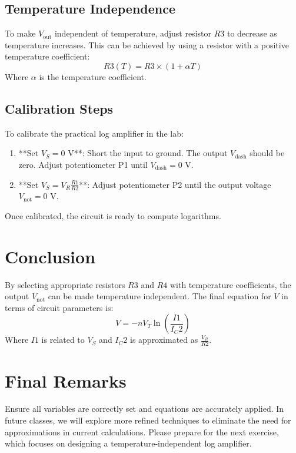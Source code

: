 \subsection{Temperature Independence}

To make \( V_{\text{out}} \) independent of temperature, adjust resistor \( R3 \) to decrease as temperature increases. This can be achieved by using a resistor with a positive temperature coefficient:
\[
R3(T) = R3 \times (1 + \alpha T)
\]
Where \( \alpha \) is the temperature coefficient.

\subsection{Calibration Steps}

To calibrate the practical log amplifier in the lab:
\begin{enumerate}
    \item **Set \( V_S = 0 \text{ V} \)**: Short the input to ground. The output \( V_{\text{dash}} \) should be zero. Adjust potentiometer P1 until \( V_{\text{dash}} = 0 \text{ V} \).
    \item **Set \( V_S = V_R \frac{R1}{R2} \)**: Adjust potentiometer P2 until the output voltage \( V_{\text{not}} = 0 \text{ V} \).
\end{enumerate}
Once calibrated, the circuit is ready to compute logarithms.

\section{Conclusion}

By selecting appropriate resistors \( R3 \) and \( R4 \) with temperature coefficients, the output \( V_{\text{not}} \) can be made temperature independent. The final equation for \( V \) in terms of circuit parameters is:
\[
V = -n V_T \ln\left(\frac{I1}{I_C2}\right)
\]
Where \( I1 \) is related to \( V_S \) and \( I_C2 \) is approximated as \( \frac{V_R}{R2} \).

\section{Final Remarks}

Ensure all variables are correctly set and equations are accurately applied. In future classes, we will explore more refined techniques to eliminate the need for approximations in current calculations. Please prepare for the next exercise, which focuses on designing a temperature-independent log amplifier.

